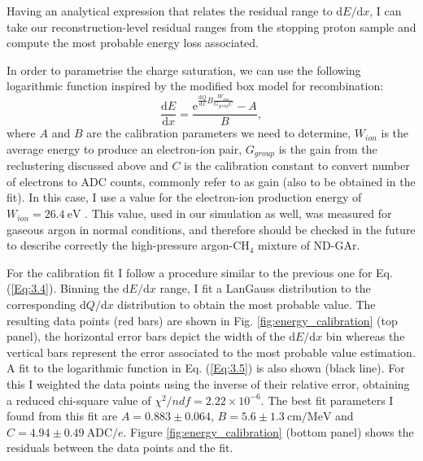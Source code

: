 Having an analytical expression that relates the residual range to $\mathrm{d}E/\mathrm{d}x$, I can take our reconstruction-level residual ranges from the stopping proton sample and compute the most probable energy loss associated.

In order to parametrise the charge saturation, we can use the following logarithmic function inspired by the modified box model for recombination:
\begin{equation}\label{Eq:3.5}
	\frac{\mathrm{d}E}{\mathrm{d}x} = \frac{\mathrm{e}^{\frac{\mathrm{d}Q}{\mathrm{d}x}B\frac{W_{ion}}{G_{group}C}}-A}{B},
\end{equation}
where $A$ and $B$ are the calibration parameters we need to determine, $W_{ion}$ is the average energy to produce an electron-ion pair, $G_{group}$ is the gain from the reclustering discussed above and $C$ is the calibration constant to convert number of electrons to ADC counts, commonly refer to as gain (also to be obtained in the fit). In this case, I use a value for the electron-ion production energy of $W_{ion} = 26.4 \ \mathrm{eV}$ \cite{Aprile2008}. This value, used in our simulation as well, was measured for gaseous argon in normal conditions, and therefore should be checked in the future to describe correctly the high-pressure argon-$\mathrm{CH}_{4}$ mixture of ND-GAr.

For the calibration fit I follow a procedure similar to the previous one for Eq. (\ref{Eq:3.4}). Binning the $\mathrm{d}E/\mathrm{d}x$ range, I fit a LanGauss distribution to the corresponding $\mathrm{d}Q/\mathrm{d}x$ distribution to obtain the most probable value. The resulting data points (red bars) are shown in Fig. \ref{fig:energy_calibration} (top panel), the horizontal error bars depict the width of the $\mathrm{d}E/\mathrm{d}x$ bin whereas the vertical bars represent the error associated to the most probable value estimation. A fit to the logarithmic function in Eq. (\ref{Eq:3.5}) is also shown (black line). For this I weighted the data points using the inverse of their relative error, obtaining a reduced chi-square value of $\chi^{2}/ndf=2.22\times10^{-6}$. The best fit parameters I found from this fit are $A = 0.883 \pm 0.064$, $B=5.6\pm1.3~\mathrm{cm}/\mathrm{MeV}$ and $C = 4.94 \pm 0.49 \ \mathrm{ADC}/e$. Figure \ref{fig:energy_calibration} (bottom panel) shows the residuals between the data points and the fit.

